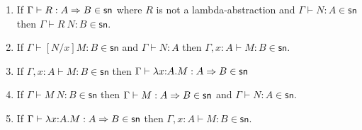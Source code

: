\documentclass{article}
\newcommand{\csn}{\mathsf{sn}}
\newcommand{\red}{\longrightarrow}
\begin{document}
\begin{lemma}\label{lem:psn}$\;$
  \begin{enumerate}
  \item\label{pp2} If $\Gamma \vdash R : A \arrow B \in \csn$ where $R$ is not a lambda-abstraction and $\Gamma \vdash N : A \in \csn$
    then $\Gamma \vdash R~N : B \in \csn$.
  \item\label{pp3} If $\Gamma \vdash [N/x]M : B \in \csn$ and $\Gamma \vdash N : A$ then $\Gamma, x{:}A \vdash M : B \in \csn$.
  \item\label{pp4} If $\Gamma, x{:}A \vdash M : B \in \csn$ then $\Gamma \vdash  \lambda x{:}A.M : A \arrow B \in \csn$
  \item\label{pp6} If $\Gamma \vdash M~N : B \in \csn$ then
     $\Gamma \vdash M : A \arrow B \in \csn$ and $\Gamma \vdash N : A\in \csn$.
  \item\label{pp7} If $\Gamma \vdash \lambda x{:}A.M : A \arrow B \in \csn$
     then $\Gamma, x{:}A \vdash M : B \in \csn$.

  \end{enumerate}
\end{lemma}
\end{document}
